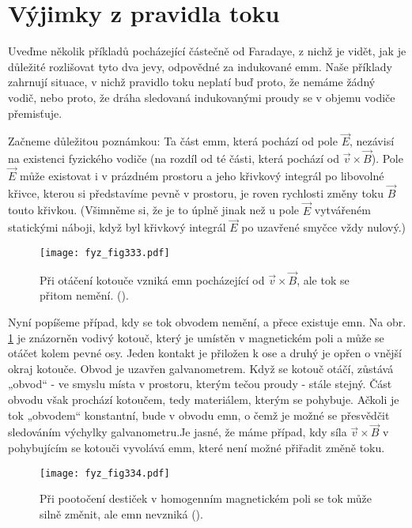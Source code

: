 \section{Výjimky z pravidla toku}\label{fyz:IIchapXVIIsecII}
  Uveďme několik příkladů pocházející částečně od Faradaye, z nichž je vidět, jak je důležité 
  rozlišovat tyto dva jevy, odpovědné za indukované emm. Naše příklady zahrnují situace, v nichž 
  pravidlo toku neplatí buď proto, že nemáme žádný vodič, nebo proto, že dráha sledovaná 
  indukovanými proudy se v objemu vodiče přemisťuje.

  Začneme důležitou poznámkou: Ta část emm, která pochází od pole \(\vec{E}\), nezávisí na 
  existenci fyzického vodiče (na rozdíl od té části, která pochází od \(\vec{v}\times\vec{B}\)). 
  Pole \(\vec{E}\) může existovat i v prázdném prostoru a jeho křivkový integrál po libovolné 
  křivce, kterou si představíme pevně v prostoru, je roven rychlosti změny toku \(\vec{B}\) touto 
  křivkou. (Všimněme si, že je to úplně jinak než u pole \(\vec{E}\) vytvářeném statickými náboji, 
  když byl křivkový integrál \(\vec{E}\) po uzavřené smyčce vždy nulový.)

  \begin{figure}[ht!]  %
    \centering
    \texttt{[image: fyz\_fig333.pdf]}
    \caption{Při otáčení kotouče vzniká emn pocházející od \(\vec{v}\times\vec{B}\), ale tok se 
             přitom nemění.
             (\cite[s.~296]{Feynman02}).}
    \label{fyz:fig333}
  \end{figure}
  
  Nyní popíšeme případ, kdy se tok obvodem nemění, a přece existuje emn. Na obr. \ref{fyz:fig333} 
  je znázorněn vodivý kotouč, který je umístěn v magnetickém poli a může se otáčet kolem pevné osy. 
  Jeden kontakt je přiložen k ose a druhý je opřen o vnější okraj kotouče. Obvod je uzavřen 
  galvanometrem. Když se kotouč otáčí, zůstává „obvod“ - ve smyslu místa v prostoru, kterým tečou 
  proudy - stále stejný. Část obvodu však prochází kotoučem, tedy materiálem, kterým se pohybuje. 
  Ačkoli je tok „obvodem“ konstantní, bude v obvodu emn, o čemž je možné se přesvědčit sledováním 
  výchylky galvanometru.Je jasné, že máme případ, kdy síla \(\vec{v}\times\vec{B}\) v pohybujícím 
  se kotouči vyvolává emm, které není možné přiřadit změně toku.
  
  \begin{figure}[ht!]  %
    \centering
    \texttt{[image: fyz\_fig334.pdf]}
    \caption{Při pootočení destiček v homogenním magnetickém poli se tok může silně změnit, ale emn
             nevzniká
             (\cite[s.~296]{Feynman02}).}
    \label{fyz:fig334}
  \end{figure}
  
